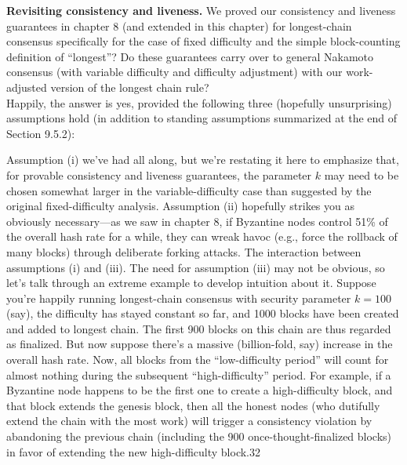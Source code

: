 \noindent
\textbf{Revisiting consistency and liveness.} We proved our consistency and liveness guarantees in chapter 8 (and extended in this chapter) for longest-chain consensus specifically for
the case of fixed difficulty and the simple block-counting definition of “longest”? Do these
guarantees carry over to general Nakamoto consensus (with variable difficulty and difficulty
adjustment) with our work-adjusted version of the longest chain rule?\\
Happily, the answer is yes, provided the following three (hopefully unsurprising) assumptions hold (in addition to standing assumptions summarized at the end of Section 9.5.2):

Assumption (i) we've had all along, but we’re restating it here to emphasize that, for provable
consistency and liveness guarantees, the parameter $k$ may need to be chosen somewhat
larger in the variable-difficulty case than suggested by the original fixed-difficulty analysis.
Assumption (ii) hopefully strikes you as obviously necessary—as we saw in chapter 8, if
Byzantine nodes control 51\% of the overall hash rate for a while, they can wreak
havoc (e.g., force the rollback of many blocks) through deliberate forking attacks.
The interaction between assumptions (i) and (iii). The need for assumption (iii)
may not be obvious, so let’s talk through an extreme example to develop intuition about it.
Suppose you’re happily running longest-chain consensus with security parameter $k = 100$ (say), the difficulty has stayed constant so far, and 1000 blocks have been created and added to
longest chain. The first 900 blocks on this chain are thus regarded as finalized. But now
suppose there’s a massive (billion-fold, say) increase in the overall hash rate. Now, all blocks
from the “low-difficulty period” will count for almost nothing during the subsequent “high-difficulty” period. For example, if a Byzantine node happens to be the first one to create
a high-difficulty block, and that block extends the genesis block, then all the honest nodes
(who dutifully extend the chain with the most work) will trigger a consistency violation
by abandoning the previous chain (including the 900 once-thought-finalized blocks) in favor
of extending the new high-difficulty block.32\\

